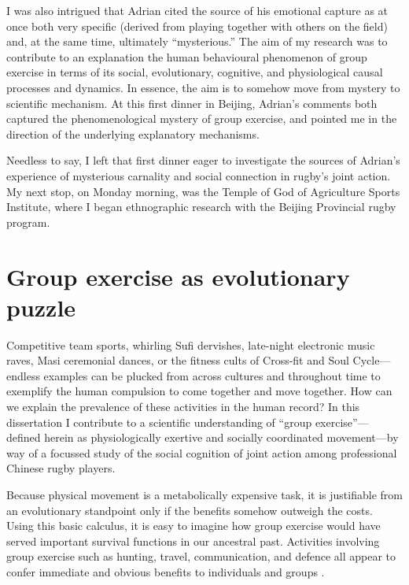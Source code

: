 \begin{CJK}{UTF8}{gbsn}
I was also intrigued that Adrian cited the source of his emotional capture as at once both very specific (derived from playing together with others on the field) and, at the same time, ultimately ``mysterious.''  The aim of my research was to contribute to an explanation the human behavioural phenomenon of group exercise in terms of its social, evolutionary, cognitive, and physiological causal processes and dynamics.  In essence, the aim is to somehow move from mystery to scientific mechanism.  At this first dinner in Beijing, Adrian's comments both captured the phenomenological mystery of group exercise, and pointed me in the direction of the underlying explanatory mechanisms.

Needless to say, I left that first dinner eager to investigate the sources of Adrian's experience of mysterious carnality and social connection in rugby's joint action.  My next stop, on Monday morning, was the Temple of God of Agriculture Sports Institute, where I began ethnographic research with the Beijing Provincial rugby program.


                            \begin{center}

                            \end{center}





\section{Group exercise as evolutionary puzzle}
Competitive team sports, whirling Sufi dervishes, late-night electronic music raves, Masi ceremonial dances, or the fitness cults of Cross-fit and Soul Cycle---endless examples can be plucked from across cultures and throughout time to exemplify the human compulsion to come together and move together.  How can we explain the prevalence of these activities in the human record?  In this dissertation I contribute to a scientific understanding of ``group exercise''---defined herein as physiologically exertive and socially coordinated movement---by way of a focussed study of the social cognition of joint action among professional Chinese rugby players.

Because physical movement is a metabolically expensive task, it is justifiable from an evolutionary standpoint only if the benefits somehow outweigh the costs.  Using this basic calculus, it is easy to imagine how group exercise would have served important survival functions in our ancestral past.  Activities involving group exercise such as hunting, travel, communication, and defence all appear to confer immediate and obvious benefits to individuals and groups \citep{Sands2010}.


\end{CJK}
